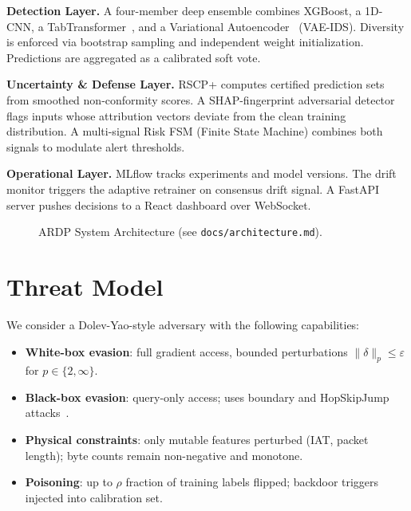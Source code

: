 \documentclass[conference]{IEEEtran}
\begin{document}
\textbf{Detection Layer.} A four-member deep ensemble combines XGBoost,
a 1D-CNN, a TabTransformer~\cite{huang2021tabtransformer}, and a Variational
Autoencoder~\cite{kingma2014auto} (VAE-IDS). Diversity is enforced via
bootstrap sampling and independent weight initialization.
Predictions are aggregated as a calibrated soft vote.

\textbf{Uncertainty \& Defense Layer.} RSCP+ computes certified
prediction sets from smoothed non-conformity scores. A SHAP-fingerprint
adversarial detector flags inputs whose attribution vectors deviate from
the clean training distribution. A multi-signal Risk FSM (Finite State Machine)
combines both signals to modulate alert thresholds.

\textbf{Operational Layer.} MLflow tracks experiments and model versions.
The drift monitor triggers the adaptive retrainer on consensus drift signal.
A FastAPI server pushes decisions to a React dashboard over WebSocket.

\begin{figure}[ht]
  \centering
  \fbox{\rule{0pt}{2.5cm}\rule{0.95\linewidth}{0pt}}
  \caption{ARDP System Architecture (see \texttt{docs/architecture.md}).}
  \label{fig:arch}
\end{figure}

\section{Threat Model}
\label{sec:threat}

We consider a Dolev-Yao-style adversary with the following capabilities:

\begin{itemize}
  \item \textbf{White-box evasion}: full gradient access, bounded perturbations
        $\|\delta\|_p \le \varepsilon$ for $p \in \{2, \infty\}$.
  \item \textbf{Black-box evasion}: query-only access; uses boundary and
        HopSkipJump attacks~\cite{chen2020hopskipjumpattack}.
  \item \textbf{Physical constraints}: only mutable features perturbed
        (IAT, packet length); byte counts remain non-negative and monotone.
  \item \textbf{Poisoning}: up to $\rho$ fraction of training labels flipped;
        backdoor triggers injected into calibration set.
\end{itemize}
\end{document}
